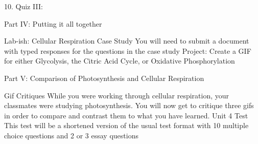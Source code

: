 	10. Quiz III: 
	

	Part IV: Putting it all together
	

	Lab-ish: Cellular Respiration Case Study
	You will need to submit a document with typed responses for the questions in the case study
	Project: Create a GIF for either Glycolysis, the Citric Acid Cycle, or Oxidative Phosphorylation
	

	Part V: Comparison of Photosynthesis and Cellular Respiration
	

	Gif Critiques
	While you were working through cellular respiration, your classmates were studying photosynthesis. You will now get to critique three gifs in order to compare and contrast them to what you have learned.
	Unit 4 Test
	This test will be a shortened version of the usual test format with 10 multiple choice questions and 2 or 3 essay questions